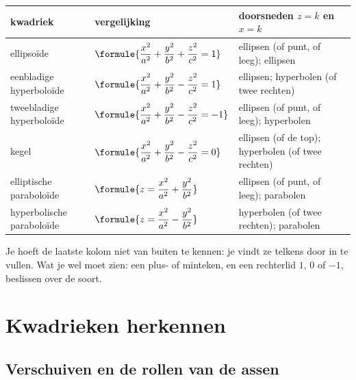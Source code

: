 \begin{theorie}
{\centering{}\renewcommand{\arraystretch}{1.5}%
\begin{tabular}{|>{\centering\arraybackslash}m{3.3cm}|>{\centering\arraybackslash}m{3.9cm}|>{\centering\arraybackslash}m{5cm}|}
\hline
\textbf{kwadriek} & \textbf{vergelijking} & \textbf{doorsneden $z = k$ en $x = k$} \\ \hline
ellipsoïde & $\formule{\dfrac{x^2}{a^2} + \dfrac{y^2}{b^2} + \dfrac{z^2}{c^2} = 1}$ & ellipsen (of punt, of leeg); ellipsen \\ \hline
eenbladige hyperboloïde & $\formule{\dfrac{x^2}{a^2} + \dfrac{y^2}{b^2} - \dfrac{z^2}{c^2} = 1}$ & ellipsen; hyperbolen (of twee rechten) \\ \hline
tweebladige hyperboloïde & $\formule{\dfrac{x^2}{a^2} + \dfrac{y^2}{b^2} - \dfrac{z^2}{c^2} = -1}$ & ellipsen (of punt, of leeg); hyperbolen \\ \hline
kegel & $\formule{\dfrac{x^2}{a^2} + \dfrac{y^2}{b^2} - \dfrac{z^2}{c^2} = 0}$ & ellipsen (of de top); hyperbolen (of twee rechten) \\ \hline
elliptische paraboloïde & $\formule{z = \dfrac{x^2}{a^2} + \dfrac{y^2}{b^2}}$ & ellipsen (of punt, of leeg); parabolen \\ \hline
hyperbolische paraboloïde & $\formule{z = \dfrac{x^2}{a^2} - \dfrac{y^2}{b^2}}$ & hyperbolen (of twee rechten); parabolen \\ \hline
\end{tabular}\par}
\end{theorie}

Je hoeft de laatste kolom niet van buiten te kennen: je vindt ze telkens door in te vullen. Wat je wel moet zien: een plus- of minteken, en een rechterlid $1$, $0$ of $-1$, beslissen over de soort.

\begin{oefeningen}
\end{oefeningen}

\section{Kwadrieken herkennen}

\subsection{Verschuiven en de rollen van de assen}


